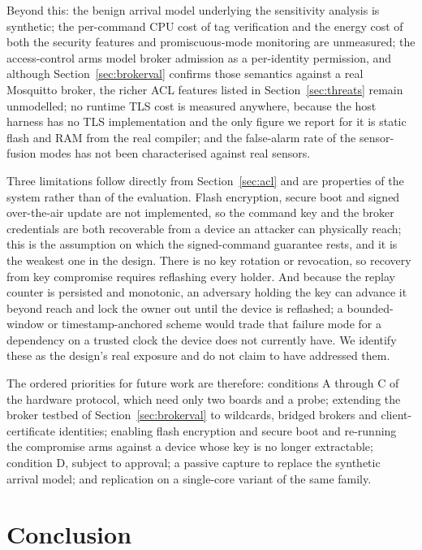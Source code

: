 Beyond this: the benign arrival model underlying the sensitivity analysis is synthetic; the
per-command CPU cost of tag verification and the energy cost of both the security features and
promiscuous-mode monitoring are unmeasured; the access-control arms model broker admission as a
per-identity permission, and although Section~\ref{sec:brokerval} confirms those semantics
against a real Mosquitto broker, the richer ACL features listed in Section~\ref{sec:threats}
remain unmodelled; no runtime TLS cost is measured anywhere, because the
host harness has no TLS implementation and the only figure we report for it is static flash and
RAM from the real compiler; and the false-alarm rate of the sensor-fusion modes has not been
characterised against real sensors.

Three limitations follow directly from Section~\ref{sec:acl} and are properties of the system
rather than of the evaluation. Flash encryption, secure boot and signed over-the-air update are
not implemented, so the command key and the broker credentials are both recoverable from a
device an attacker can physically reach; this is the assumption on which the signed-command
guarantee rests, and it is the weakest one in the design. There is no key rotation or
revocation, so recovery from key compromise requires reflashing every holder. And because the
replay counter is persisted and monotonic, an adversary holding the key can advance it beyond
reach and lock the owner out until the device is reflashed; a bounded-window or
timestamp-anchored scheme would trade that failure mode for a dependency on a trusted clock the
device does not currently have. We identify these as the design's real exposure and do not
claim to have addressed them.

The ordered priorities for future work are therefore: conditions A through C of the hardware
protocol, which need only two boards and a probe; extending the broker testbed of
Section~\ref{sec:brokerval} to wildcards, bridged brokers and client-certificate identities; enabling
flash encryption and secure boot and re-running the compromise arms against a device whose key
is no longer extractable; condition D, subject to approval; a passive capture to replace the
synthetic arrival model; and replication on a single-core variant of the same family.

\section{Conclusion}\label{sec:conclusion}

